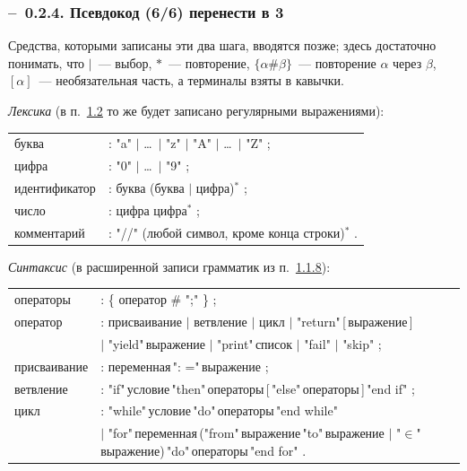 \documentclass[mathserif,12pt,aspectratio=169]{beamer}
\def\emразделенной{\em разделенной}
\def\em#1{\it\color{blue}#1}
\def\NB#1{{\bf\color{brown}#1}}
\def\DMref#1#2{{\color{blue}\underline{\hyperlink{#2}{#1}}}}
\def\Er{{\color{red}\textbf{--}\ }}
\begin{document}
\begin{frame}
\frametitle{\Er 0.2.4. Псевдокод (6/6) \NB{перенести в 3}}

Средства, которыми записаны эти два шага, вводятся позже; здесь достаточно
понимать, что $\mid$~--- выбор, $*$~--- повторение, $\{\alpha \# \beta\}$~---
повторение $\alpha$ через $\beta$, $[\alpha]$~--- необязательная часть, а
терминалы взяты в кавычки.

\smallskip
{\em Лексика} (в п.~\DMref{1.2}{1.2.} то же будет записано регулярными
выражениями):
\vspace{-4pt}
\begin{center}\scriptsize
\begin{tabular}{@{}ll@{}}
буква & : "a" $\mid$ \dots\ $\mid$ "z" $\mid$ "A" $\mid$ \dots\ $\mid$ "Z" ; \\
цифра & : "0" $\mid$ \dots\ $\mid$ "9" ; \\
идентификатор & : буква (буква $\mid$ цифра)$^*$ ; \\
число & : цифра цифра$^*$ ; \\
комментарий & : "//" (любой символ, кроме конца строки)$^*$ . \\
\end{tabular}
\end{center}
\vspace{-4pt}

{\em Синтаксис} (в расширенной записи грамматик из п.~\DMref{1.1.8}{1.1.8.}):
\vspace{-4pt}
\begin{center}\scriptsize
\begin{tabular}{@{}ll@{}}
операторы & : \{ оператор \# ";" \} ; \\
оператор & : присваивание $\mid$ ветвление $\mid$ цикл
 $\mid$ "return"\,[\,выражение\,] \\
 & $\mid$ "yield"\,выражение $\mid$ "print"\,список $\mid$ "fail" $\mid$ "skip" ; \\
присваивание & : переменная\,": ="\,выражение ; \\
ветвление & : "if"\,условие\,"then"\,операторы\,[\,"else"\,операторы\,]\,"end if" ; \\
цикл & : "while"\,условие\,"do"\,операторы\,"end while" \\
 & $\mid$ "for"\,переменная\,("from"\,выражение\,"to"\,выражение $\mid$
 "$\in$"\,выражение)\,"do"\,операторы\,"end for" . \\
\end{tabular}
\end{center}
\end{frame}
\end{document}
